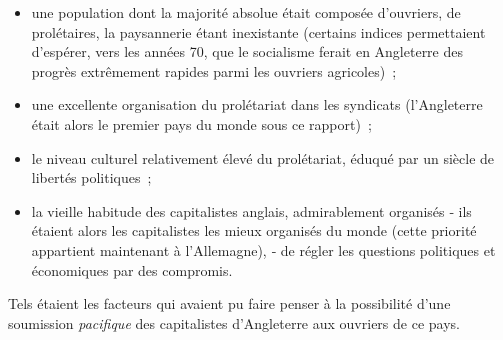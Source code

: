 \documentclass[french,twoside]{book} %
\begin{document}
\begin{itemize}[itemsep=0pt,]
\item une population dont la majorité absolue était composée d’ouvriers, de prolétaires, la paysannerie étant inexistante (certains indices permettaient d’espérer, vers les années 70, que le socialisme ferait en Angleterre des progrès extrêmement rapides parmi les ouvriers agricoles) ;
\item une excellente organisation du prolétariat dans les syndicats (l’Angleterre était alors le premier pays du monde sous ce rapport) ;
\item le niveau culturel relativement élevé du prolétariat, éduqué par un siècle de libertés politiques ;
\item la vieille habitude des capitalistes anglais, admirablement organisés ‑ ils étaient alors les capitalistes les mieux organisés du monde (cette priorité appartient maintenant à l’Allemagne), ‑ de régler les questions politiques et économiques par des compromis.
\end{itemize}
\bigbreak
\noindent Tels étaient les facteurs qui avaient pu faire penser à la possibilité d’une soumission \emph{pacifique} des capitalistes d’Angleterre aux ouvriers de ce pays.\par
\end{document}
